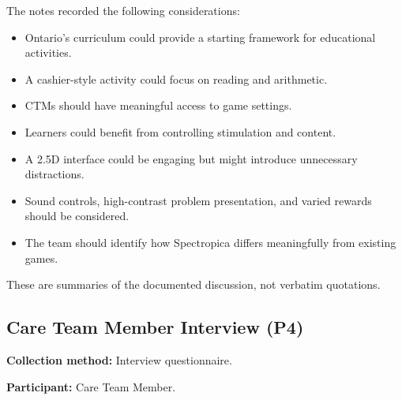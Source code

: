 \documentclass[12pt, titlepage]{article}
\begin{document}
The notes recorded the following considerations:
\begin{itemize}
\item Ontario's curriculum could provide a starting framework for educational activities.
\item A cashier-style activity could focus on reading and arithmetic.
\item CTMs should have meaningful access to game settings.
\item Learners could benefit from controlling stimulation and content.
\item A 2.5D interface could be engaging but might introduce unnecessary distractions.
\item Sound controls, high-contrast problem presentation, and varied rewards should be considered.
\item The team should identify how Spectropica differs meaningfully from existing games.
\end{itemize}

These are summaries of the documented discussion, not verbatim quotations.

\subsection{Care Team Member Interview (P4)}
\label{app:participant-4}

\noindent\textbf{Collection method:} Interview questionnaire.

\noindent\textbf{Participant:} Care Team Member.
\end{document}
